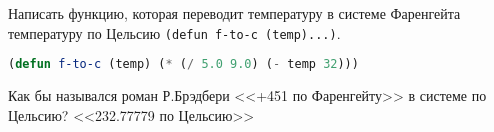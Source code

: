 Написать функцию, которая переводит температуру в системе Фаренгейта
температуру по Цельсию \verb|(defun f-to-c (temp)...)|.

\begin{lstlisting}[language=Lisp]
(defun f-to-c (temp) (* (/ 5.0 9.0) (- temp 32)))
\end{lstlisting}

Как бы назывался роман Р.Брэдбери <<+451 по Фаренгейту>> в системе по Цельсию?
<<232.77779 по Цельсию>>

